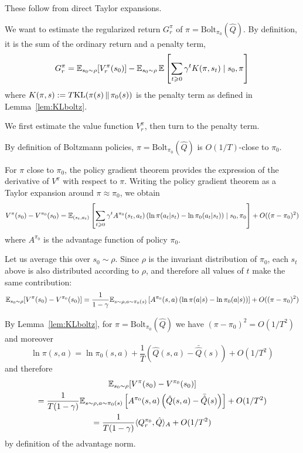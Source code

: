 \documentclass[11pt,a4paper]{article}
\newcommand{\Bol}{\mathrm{Bolt}_{\pi_0}}
\begin{document}
\begin{dem}
These follow from direct Taylor expansions.
\end{dem}


\begin{dem}
We want to estimate the regularized return $G^\pi_r$ of $\pi=\Bol(\hat Q)$. By
definition, it is the sum of the ordinary return and a penalty term,
\begin{equation}
G^{\pi}_r= \mathbb{E}_{s_0\sim \rho} [V^{\pi}_r(s_0)] - \mathbb{E}_{s_0\sim\rho}
\,\mathbb{E}\left[
\sum_{t \geqslant 0} \gamma^t K(\pi,s_t)\mid s_0,\pi
\right]
\end{equation}
where $K(\pi,s)\mathrel{\mathop{:}}= T\mathrm{KL}\!\left(\pi(s) \,|\hspace{-.15ex}|\,\pi_0(s)\right)$ is the penalty term as defined in Lemma~\ref{lem:KLboltz}.

We first estimate the value function $V^{\pi}_r$, then turn to the
penalty term.

By definition of Boltzmann policies, $\pi=\Bol(\hat Q)$ is $O(1/T)$-close to
$\pi_0$.

For $\pi$ close to $\pi_0$, the policy gradient theorem provides the
expression of the derivative of $V^{\pi}$ with respect to $\pi$. Writing
the policy gradient theorem as a Taylor expansion around $\pi\approx
\pi_0$, we obtain
\begin{equation}
V^\pi(s_0)-V^{\pi_0}(s_0)=\mathbb{E}_{(s_t,a_t)} \left[
\sum_{t\geqslant 0} \gamma^t
A^{\pi_0}(s_t,a_t)
\left(\ln \pi(a_t|s_t)-\ln \pi_0(a_t|s_t)\right)
\mid s_0,\pi_0
\right]+
O((\pi-\pi_0)^2)
\end{equation}
where $A^{\pi_0}$ is the advantage function of policy $\pi_0$.

Let us average this over $s_0\sim \rho$. Since $\rho$ is the invariant
distribution of $\pi_0$, each $s_t$ above is also distributed according
to $\rho$, and therefore all values of $t$ make the same contribution:
\begin{equation}
\mathbb{E}_{s_0\sim \rho} [V^\pi(s_0)-V^{\pi_0}(s_0)]
=\frac{1}{1-\gamma} \mathbb{E}_{s\sim \rho,a\sim \pi_0(s)}\left[
A^{\pi_0}(s,a)\left(\ln \pi(a|s)-\ln \pi_0(a|s)\right)
\right]
+
O((\pi-\pi_0)^2)
\end{equation}

By Lemma~\ref{lem:KLboltz}, for $\pi=\Bol(\hat Q)$ we have
$(\pi-\pi_0)^2=O(1/T^2)$ and moreover
\begin{equation}
\ln \pi(s,a)=\ln \pi_0(s,a)+ \frac1T(\hat Q(s,a)-\bar {\hat Q}(s))+O(1/T^2)
\end{equation}
and therefore
\begin{multline}
\mathbb{E}_{s_0\sim \rho} [V^\pi(s_0)-V^{\pi_0}(s_0)]
\\=\frac{1}{T(1-\gamma)} \mathbb{E}_{s\sim \rho,a\sim \pi_0(s)}\left[
A^{\pi_0}(s,a)\left(\hat Q(s,a)-\bar{\hat Q}(s)\right)\right]
+O(1/T^2)
\\=\frac{1}{T(1-\gamma)}\langle Q_r^{\pi_0},\hat Q\rangle_A + O(1/T^2)
\end{multline}
by definition of the advantage norm.


\end{dem}
\end{document}
